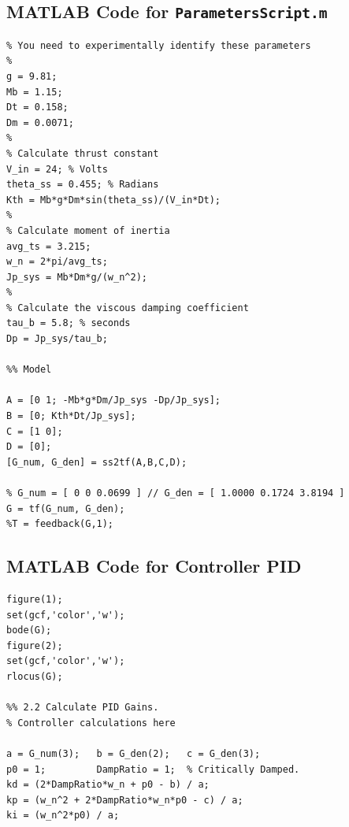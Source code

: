 \documentclass[11pt]{article}
\begin{document}
\subsection{MATLAB Code for \texttt{ParametersScript.m}}
\begin{lstlisting}[frame=single]
% System model parameters
% You need to experimentally identify these parameters
%
g = 9.81;
Mb = 1.15;
Dt = 0.158;
Dm = 0.0071;
%
% Calculate thrust constant
V_in = 24; % Volts
theta_ss = 0.455; % Radians
Kth = Mb*g*Dm*sin(theta_ss)/(V_in*Dt);
%
% Calculate moment of inertia
avg_ts = 3.215;
w_n = 2*pi/avg_ts;
Jp_sys = Mb*Dm*g/(w_n^2);
%
% Calculate the viscous damping coefficient
tau_b = 5.8; % seconds
Dp = Jp_sys/tau_b;

%% Model

A = [0 1; -Mb*g*Dm/Jp_sys -Dp/Jp_sys];
B = [0; Kth*Dt/Jp_sys];
C = [1 0];
D = [0];
[G_num, G_den] = ss2tf(A,B,C,D);

% G_num = [ 0 0 0.0699 ] // G_den = [ 1.0000 0.1724 3.8194 ]
G = tf(G_num, G_den);
%T = feedback(G,1);
\end{lstlisting}

\subsection{MATLAB Code for Controller PID}
\begin{lstlisting}[frame=single]
figure(1);
set(gcf,'color','w');
bode(G);
figure(2);
set(gcf,'color','w');
rlocus(G);

%% 2.2 Calculate PID Gains.
% Controller calculations here

a = G_num(3);   b = G_den(2);   c = G_den(3);
p0 = 1;         DampRatio = 1;  % Critically Damped.
kd = (2*DampRatio*w_n + p0 - b) / a;
kp = (w_n^2 + 2*DampRatio*w_n*p0 - c) / a;
ki = (w_n^2*p0) / a;
\end{lstlisting}
\end{document}
